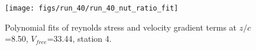 \begin{figure}[H]
\centering
\texttt{[image: figs/run\_40/run\_40\_nut\_ratio\_fit]}
\caption{Polynomial fits of reynolds stress and velocity gradient terms at $z/c$=8.50, $V_{free}$=33.44, station 4.}
\label{fig:run_40_nut_ratio_fit}
\end{figure}


